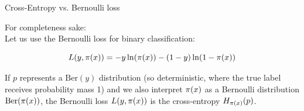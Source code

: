 
  
  

\begin{vbframe}{Cross-Entropy vs. Bernoulli loss}
    
For completeness sake:\\
  Let us use the Bernoulli loss for binary classification: 

  $$L(y,\pi(x)) = -y \ln(\pi(x)) - (1 - y) \ln (1 - \pi(x))$$

\lz

  If $p$ represents a $\text{Ber}(y)$ distribution (so deterministic, where the true label receives probability mass 1) and we also interpret $\pi(x)$ as a Bernoulli distribution $\text{Ber}(\pi(x))$, the Bernoulli loss $L(y,\pi(x))$ is the cross-entropy $H_{\pi(x)}(p)$.
\end{vbframe}

